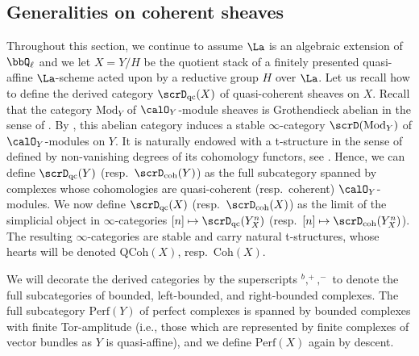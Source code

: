 \documentclass[10pt, reqno]{amsart}
\theoremstyle{plain}
\theoremstyle{definition}
\newtheorem{definition}[theorem]{Definition}
\numberwithin{equation}{section}
\begin{document}
	\subsection{Generalities on coherent sheaves}
	
	Throughout this section, we continue to assume $\La$ is an algebraic extension of $\bbQ_\ell$ and we let $X=Y/H$ be the quotient stack of a finitely presented quasi-affine $\La$-scheme acted upon by a reductive group $H$ over $\La$. Let us recall how to define the derived category $\scrD_{\mathrm{qc}}(X)$ of quasi-coherent sheaves on $X$. Recall that the category $\mathrm{Mod}_Y$ of $\calO_Y$-module sheaves is Grothendieck abelian in the sense of \cite[Definition 1.3.5.1]{Lur17}. By \cite[Definition 1.3.5.8]{Lur17}, this abelian category induces a stable $\infty$-category $\scrD(\mathrm{Mod}_Y)$ of $\calO_Y$-modules on $Y$. It is naturally endowed with a t-structure in the sense of \cite[Definition 1.2.1.4]{Lur17} defined by non-vanishing degrees of its cohomology functors, see \cite[Definition 1.3.5.16]{Lur17}. Hence, we can define $\scrD_{\mathrm{qc}}(Y)$ (resp.~$\scrD_{\mathrm{coh}}(Y)$)  as the full subcategory spanned by complexes whose cohomologies are quasi-coherent (resp.~coherent) $\calO_Y$-modules. We now define $\scrD_{\mathrm{qc}}(X)$ (resp.~$\scrD_{\mathrm{coh}}(X)$) as the limit of the simplicial object in $\infty$-categories $[n]\mapsto \scrD_{\mathrm{qc}}(Y^{n}_X)$ (resp.~$[n]\mapsto \scrD_{\mathrm{coh}}(Y^n_X)$). The resulting $\infty$-categories are stable and carry natural t-structures, whose hearts will be denoted $\mathrm{QCoh}(X)$, resp.~$\mathrm{Coh}(X)$. 
	
	We will decorate the derived categories by the superscripts $^b,^+,^-$ to denote the full subcategories of bounded, left-bounded, and right-bounded complexes. The full subcategory $\mathrm{Perf}(Y)$ of perfect complexes is spanned by bounded complexes with finite Tor-amplitude (i.e., those which are represented by finite complexes of vector bundles as $Y$ is quasi-affine), and we define $\mathrm{Perf}(X)$ again by descent.
	
\end{document}
